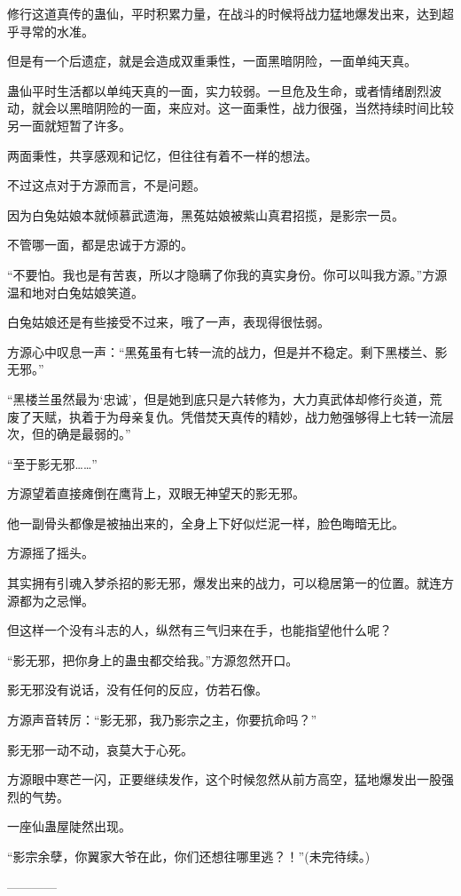 \begin{this_body}
修行这道真传的蛊仙，平时积累力量，在战斗的时候将战力猛地爆发出来，达到超乎寻常的水准。

但是有一个后遗症，就是会造成双重秉性，一面黑暗阴险，一面单纯天真。

蛊仙平时生活都以单纯天真的一面，实力较弱。一旦危及生命，或者情绪剧烈波动，就会以黑暗阴险的一面，来应对。这一面秉性，战力很强，当然持续时间比较另一面就短暂了许多。

两面秉性，共享感观和记忆，但往往有着不一样的想法。

不过这点对于方源而言，不是问题。

因为白兔姑娘本就倾慕武遗海，黑菟姑娘被紫山真君招揽，是影宗一员。

不管哪一面，都是忠诚于方源的。

“不要怕。我也是有苦衷，所以才隐瞒了你我的真实身份。你可以叫我方源。”方源温和地对白兔姑娘笑道。

白兔姑娘还是有些接受不过来，哦了一声，表现得很怯弱。

方源心中叹息一声：“黑菟虽有七转一流的战力，但是并不稳定。剩下黑楼兰、影无邪。”

“黑楼兰虽然最为‘忠诚’，但是她到底只是六转修为，大力真武体却修行炎道，荒废了天赋，执着于为母亲复仇。凭借焚天真传的精妙，战力勉强够得上七转一流层次，但的确是最弱的。”

“至于影无邪……”

方源望着直接瘫倒在鹰背上，双眼无神望天的影无邪。

他一副骨头都像是被抽出来的，全身上下好似烂泥一样，脸色晦暗无比。

方源摇了摇头。

其实拥有引魂入梦杀招的影无邪，爆发出来的战力，可以稳居第一的位置。就连方源都为之忌惮。

但这样一个没有斗志的人，纵然有三气归来在手，也能指望他什么呢？

“影无邪，把你身上的蛊虫都交给我。”方源忽然开口。

影无邪没有说话，没有任何的反应，仿若石像。

方源声音转厉：“影无邪，我乃影宗之主，你要抗命吗？”

影无邪一动不动，哀莫大于心死。

方源眼中寒芒一闪，正要继续发作，这个时候忽然从前方高空，猛地爆发出一股强烈的气势。

一座仙蛊屋陡然出现。

“影宗余孽，你翼家大爷在此，你们还想往哪里逃？！”(未完待续。)

------------

\end{this_body}

